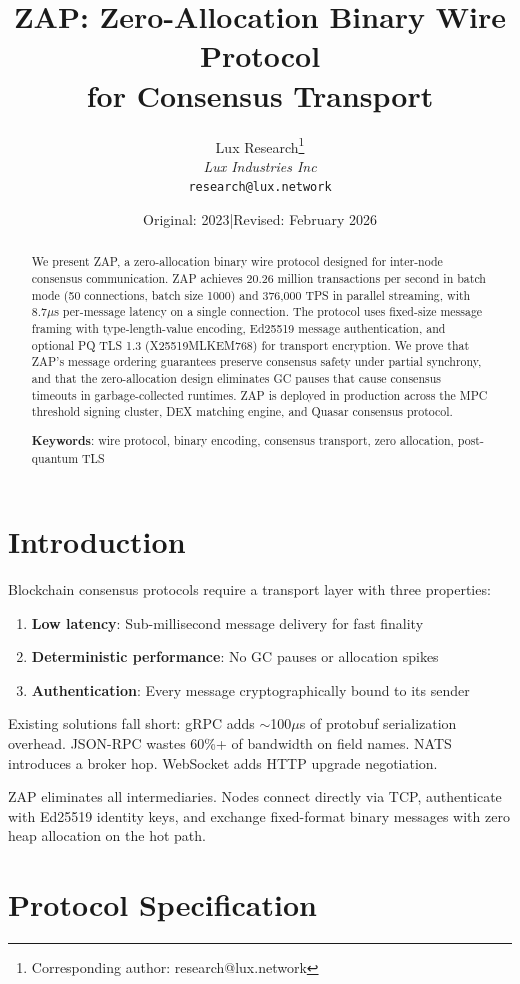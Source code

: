 \documentclass[11pt,letterpaper]{article}
\title{ZAP: Zero-Allocation Binary Wire Protocol\\for Consensus Transport}
\author{
Lux Research\thanks{Corresponding author: research@lux.network}\\
\textit{Lux Industries Inc}\\
\texttt{research@lux.network}
}
\date{Original: 2023\quad|\quad Revised: February 2026}
\begin{document}
\luxcoverpage

\begin{abstract}
We present ZAP, a zero-allocation binary wire protocol designed for inter-node consensus communication. ZAP achieves 20.26 million transactions per second in batch mode (50 connections, batch size 1000) and 376,000 TPS in parallel streaming, with 8.7$\mu$s per-message latency on a single connection. The protocol uses fixed-size message framing with type-length-value encoding, Ed25519 message authentication, and optional PQ TLS 1.3 (X25519MLKEM768) for transport encryption. We prove that ZAP's message ordering guarantees preserve consensus safety under partial synchrony, and that the zero-allocation design eliminates GC pauses that cause consensus timeouts in garbage-collected runtimes. ZAP is deployed in production across the MPC threshold signing cluster, DEX matching engine, and Quasar consensus protocol.

\textbf{Keywords}: wire protocol, binary encoding, consensus transport, zero allocation, post-quantum TLS
\end{abstract}

\section{Introduction}

Blockchain consensus protocols require a transport layer with three properties:
\begin{enumerate}
    \item \textbf{Low latency}: Sub-millisecond message delivery for fast finality
    \item \textbf{Deterministic performance}: No GC pauses or allocation spikes
    \item \textbf{Authentication}: Every message cryptographically bound to its sender
\end{enumerate}

Existing solutions fall short: gRPC adds $\sim$100$\mu$s of protobuf serialization overhead. JSON-RPC wastes 60\%+ of bandwidth on field names. NATS introduces a broker hop. WebSocket adds HTTP upgrade negotiation.

ZAP eliminates all intermediaries. Nodes connect directly via TCP, authenticate with Ed25519 identity keys, and exchange fixed-format binary messages with zero heap allocation on the hot path.

\section{Protocol Specification}
\end{document}
